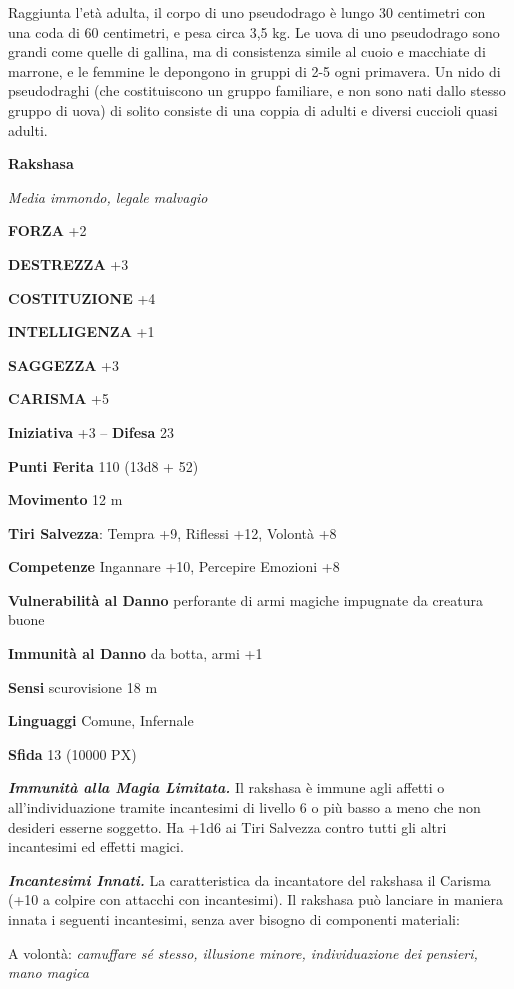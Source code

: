 \begin{multicols}{2}
Raggiunta l'età adulta, il corpo di uno pseudodrago è lungo 30 centimetri con una coda di 60 centimetri, e pesa circa 3,5 kg. Le uova di uno pseudodrago sono grandi come quelle di gallina, ma di consistenza simile al cuoio e macchiate di marrone, e le femmine le depongono in gruppi di 2-5 ogni primavera. Un nido di pseudodraghi (che costituiscono un gruppo familiare, e non sono nati dallo stesso gruppo di uova) di solito consiste di una coppia di adulti e diversi cuccioli quasi adulti.


\medskip{}\textbf{Rakshasa}

\textit{Media immondo, legale malvagio}

\textbf{FORZA} +2

\textbf{DESTREZZA} +3

\textbf{COSTITUZIONE} +4

\textbf{INTELLIGENZA} +1

\textbf{SAGGEZZA} +3

\textbf{CARISMA} +5

\textbf{Iniziativa} +3 -- \textbf{Difesa} 23

\textbf{Punti Ferita} 110 (13d8 + 52)

\textbf{Movimento} 12 m

\textbf{Tiri Salvezza}: Tempra +9, Riflessi +12, Volontà +8

\textbf{Competenze} Ingannare +10, Percepire Emozioni +8

\textbf{Vulnerabilità al Danno} perforante di armi magiche impugnate da
creatura buone

\textbf{Immunità al Danno} da botta, armi +1

\textbf{Sensi} scurovisione 18 m

\textbf{Linguaggi} Comune, Infernale

\textbf{Sfida} 13 (10000 PX)

\textit{\textbf{Immunità alla Magia Limitata.}} Il rakshasa è immune agli affetti o all'individuazione tramite incantesimi di livello 6 o più basso a meno che non desideri esserne soggetto. Ha +1d6 ai Tiri Salvezza contro tutti gli altri incantesimi ed effetti magici.

\textit{\textbf{Incantesimi Innati.}} La caratteristica da incantatore del rakshasa il Carisma (+10 a colpire  con attacchi con incantesimi). Il rakshasa può lanciare in maniera innata i seguenti incantesimi, senza aver bisogno di componenti materiali:

A volontà: \textit{camuffare sé stesso, illusione minore, individuazione} \textit{dei pensieri, mano magica}


\end{multicols}
